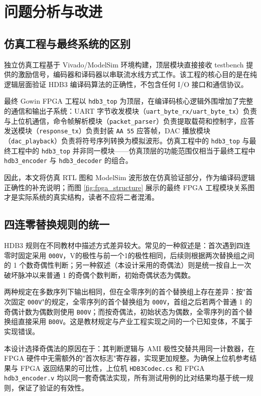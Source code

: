 \documentclass[UTF8,a4paper,12pt]{ctexart}
\begin{document}
\newpage
\section{问题分析与改进}

\subsection{仿真工程与最终系统的区别}

独立仿真工程基于 Vivado/ModelSim 环境构建，顶层模块直接接收 testbench 提供的激励信号，编码器和译码器以串联流水线方式工作。该工程的核心目的是在纯逻辑层面验证 HDB3 编译码算法的正确性，不包含任何 I/O 接口和通信协议。

最终 Gowin FPGA 工程以 \texttt{hdb3\_top} 为顶层，在编译码核心逻辑外围增加了完整的通信和输出子系统：UART 字节收发模块（\texttt{uart\_byte\_rx/uart\_byte\_tx}）负责与上位机通信，命令帧解析模块（\texttt{packet\_parser}）负责提取载荷和控制字，应答发送模块（\texttt{response\_tx}）负责封装 \texttt{AA 55} 应答帧，DAC 播放模块（\texttt{dac\_playback}）负责将符号序列转换为模拟波形。仿真工程中的 \texttt{hdb3\_top} 与最终工程中的 \texttt{hdb3\_top} 并非同一模块——仿真顶层的功能范围仅相当于最终工程中 \texttt{hdb3\_encoder} 与 \texttt{hdb3\_decoder} 的组合。

因此，本文将仿真 RTL 图和 ModelSim 波形放在仿真验证部分，作为编译码逻辑正确性的补充说明；而图 \ref{fig:fpga_structure} 展示的最终 FPGA 工程模块关系图才是实际系统的真实结构，读者不应将二者混淆。

\subsection{四连零替换规则的统一}

HDB3 规则在不同教材中描述方式差异较大。常见的一种叙述是：首次遇到四连零时固定采用 \texttt{000V}，V的极性与前一个1的极性相同，后续则根据两次替换组之间的 1 个数奇偶性判断；另一种叙述（本设计采用的奇偶法）则是统一按自上一次破坏脉冲以来普通 1 的奇偶个数判断，初始奇偶状态为偶数。

两种规定在多数序列下输出相同，但在全零序列的首个替换组上存在差异：按"首次固定 \texttt{000V}"的规定，全零序列的首个替换组为 \texttt{000V}，首组之后若两个普通 1 的奇偶计数为偶数则使用 \texttt{B00V}；而按奇偶法，初始状态为偶数，全零序列的首个替换组直接采用 \texttt{B00V}。这是教材规定与产业工程实现之间的一个已知变体，不属于实现错误。

本设计选择奇偶法的原因在于：其判断逻辑与 AMI 极性交替共用同一计数器，在 FPGA 硬件中无需额外的"首次标志"寄存器，实现更加规整。为确保上位机参考结果与 FPGA 返回结果的可比性，上位机 \texttt{HDB3Codec.cs} 和 FPGA \texttt{hdb3\_encoder.v} 均以同一套奇偶法实现，所有测试用例的比对结果均基于统一规则，保证了验证的有效性。
\end{document}
